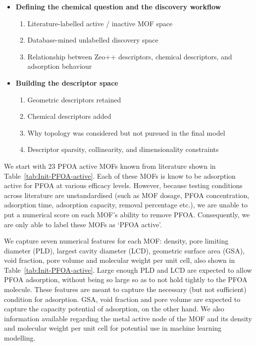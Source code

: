 \documentclass[twoside,twocolumn,9pt]{article}
\begin{document}
\begin{itemize}
	\item \textbf{Defining the chemical question and the discovery workflow}
	\begin{enumerate}
		\item Literature-labelled active / inactive MOF space
		\item Database-mined unlabelled discovery space
		\item Relationship between Zeo++ descriptors, chemical descriptors, and adsorption behaviour
	\end{enumerate}
	
	\item \textbf{Building the descriptor space}
	\begin{enumerate}
		\item Geometric descriptors retained
		\item Chemical descriptors added
		\item Why topology was considered but not pursued in the final model
		\item Descriptor sparsity, collinearity, and dimensionality constraints
	\end{enumerate}
\end{itemize}
We start with 23 PFOA active MOFs known from literature  shown in Table~\ref{tab:Init-PFOA-active}. Each of these MOFs is know to be adsorption active for PFOA at various efficacy levels. However, because testing conditions across literature are unstandardised (such as MOF dosage, PFOA concentration, adsorption time, adsorption capacity, removal percentage etc.), we are unable to put a numerical score on each MOF's ability to remove PFOA. Consequently, we are only able to label these MOFs as `PFOA active'.

We capture seven numerical features for each MOF: density, pore limiting diameter (PLD), largest cavity diameter (LCD), geometric surface area (GSA), void fraction, pore volume and molecular weight per unit cell, also shown in Table~\ref{tab:Init-PFOA-active}. Large enough PLD and LCD are expected to allow PFOA adsorption, without being so large so as to not hold tightly to the PFOA molecule. These features are meant to capture the necessary (but not sufficient) condition for adsorption. GSA, void fraction and pore volume are expected to capture the capacity potential of adsorption, on the other hand. We also information available regarding the metal active node of the MOF and its density and molecular weight per unit cell for potential use in machine learning modelling.
\end{document}
